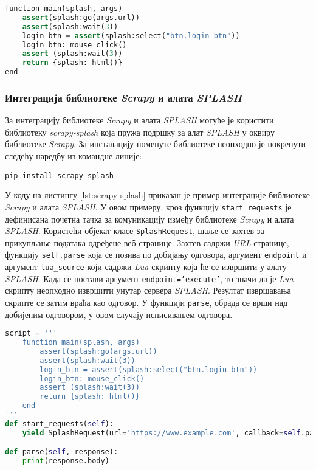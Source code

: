 \documentclass[12pt,oneside]{memoir}
\begin{document}
\begin{lstlisting}[language=Python, caption={Пример кода програмског језика \textit{LUA}}, label={lst:lua}]
function main(splash, args)
    assert(splash:go(args.url))
    assert(splash:wait(3))
    login_btn = assert(splash:select("btn.login-btn"))
    login_btn: mouse_click()
    assert (splash:wait(3))
    return {splash: html()}
end
\end{lstlisting}

\subsubsection{Интеграција библиотеке \textit{Scrapy} и алата \textit{SPLASH}}
За интеграцију библиотеке \textit{Scrapy} и алата \textit{SPLASH} могуће је користити библиотеку \textit{scrapy-splash} која пружа подршку за алат \textit{SPLASH} у оквиру библиотеке \textit{Scrapy}. За инсталацију поменуте библиотеке неопходно је покренути следећу наредбу из командне линије:
\begin{verbatim}
pip install scrapy-splash
\end{verbatim}

У коду на листингу \ref{lst:scrapy-splash} приказан је пример интеграције библиотеке \textit{Scrapy} и алата \textit{SPLASH}. У овом примеру, кроз функцију \texttt{start\_requests} је дефинисана почетна тачка за комуникацију између библиотеке \textit{Scrapy} и алата \textit{SPLASH}. Користећи објекат класе \texttt{SplashRequest}, шаље се захтев за прикупљање података одређене веб-странице. Захтев садржи \textit{URL} странице, функцију \texttt{self.parse} која се позива по добијању одговора, аргумент \texttt{endpoint} и аргумент \texttt{lua\_source} који садржи \textit{Lua} скрипту која ће се извршити у алату \textit{SPLASH}. Када се постави аргумент \texttt{endpoint='execute'}, то значи да је \textit{Lua} скрипту неопходно извршити унутар сервера \textit{SPLASH}. Резултат извршавања скрипте се затим враћа као одговор. У функцији \texttt{parse}, обрада се врши над добијеним одговором, у овом случају исписивањем одговора. 
\begin{lstlisting}[language=Python, caption={Пример интеграције библиотеке \textit{Scrapy} и алата \textit{SPLASH}}, label={lst:scrapy-splash}]
script = '''
    function main(splash, args)
        assert(splash:go(args.url))
        assert(splash:wait(3))
        login_btn = assert(splash:select("btn.login-btn"))
        login_btn: mouse_click()
        assert (splash:wait(3))
        return {splash: html()}
    end
'''
def start_requests(self):
    yield SplashRequest(url='https://www.example.com', callback=self.parse, endpoint='execute', args {'lua_source':self.script})

def parse(self, response):
    print(response.body)
\end{lstlisting}
\end{document}
